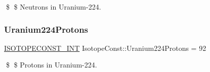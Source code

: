 \$ \$ Neutrons in Uranium-\/224. \mbox{\label{group___isotope_const-_uranium-_u224_ga5fa7fdbce15ac4d1fd0da8de67e4ca2b}} 
\subsubsection{\texorpdfstring{Uranium224\+Protons}{Uranium224Protons}}
{\footnotesize\ttfamily \mbox{\hyperlink{group___isotope_const-_macros_ga5f18360b3e99483a35c32d789e62621c}{I\+S\+O\+T\+O\+P\+E\+C\+O\+N\+S\+T\+\_\+\+I\+NT}} Isotope\+Const\+::\+Uranium224\+Protons = 92}

\$ \$ Protons in Uranium-\/224. 
